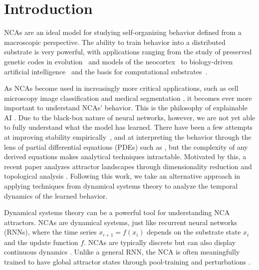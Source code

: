 \documentclass[letterpaper]{article}
\begin{document}
\vspace{-0.5em}
\section{Introduction}

NCAs are an ideal model for studying self-organizing behavior defined from a macroscopic perspective. The ability to train behavior into a distributed substrate is very powerful, with applications ranging from the study of preserved genetic codes in evolution~\citep{chow_developmentnecessitatesevolutionarily} and models of the neocortex~\citep{kvalsund_sensormovementdrives} to biology-driven artificial intelligence~\citep{hartl_neuralcellularautomata} and the basis for computational substrates~\citep{pontesfilho_reservoircomputingevolved, barandiaran_growingreservoirsdevelopmental}.

As NCAs become used in increasingly more critical applications, such as cell microscopy image classification \citep{yang2025hierarchical, yang2025attention} and medical segmentation \citep{kalkhof2025med}, it becomes ever more important to understand NCAs' behavior. This is the philosophy of explainable AI \citep{dwivedi2023explainable}. Due to the black-box nature of neural networks, however, we are not yet able to fully understand what the model has learned. There have been a few attempts at improving stability empirically~\citep{stovold_identityincreasesstability, stovold_emergentmovementincreased}, and at interpreting the behavior through the lens of partial differential equations (PDEs) such as \citep{niklasson_asynchronicityneuralcellular, mordvintsev_differentiableprogrammingreaction, pajouheshgar_discoveringpartialdifferential}, but the complexity of any derived equations makes analytical techniques intractable. Motivated by this, a recent paper analyzes attractor landscapes through dimensionality reduction and topological analysis \citep{stovold2026landscapes}. Following this work, we take an alternative approach in applying techniques from dynamical systems theory to analyze the temporal dynamics of the learned behavior.

Dynamical systems theory can be a powerful tool for understanding NCA attractors. NCAs are dynamical systems, just like recurrent neural networks (RNNs), where the time series $x_{i+1} = f(x_i)$ depends on the substrate state $x_i$ and the update function $f$. NCAs are typically discrete but can also display continuous dynamics \citep{pajouheshgar_discoveringpartialdifferential}. Unlike a general RNN, the NCA is often meaningfully trained to have global attractor states through pool-training and perturbations \citep{mordvintsev2020growing}.
\end{document}
